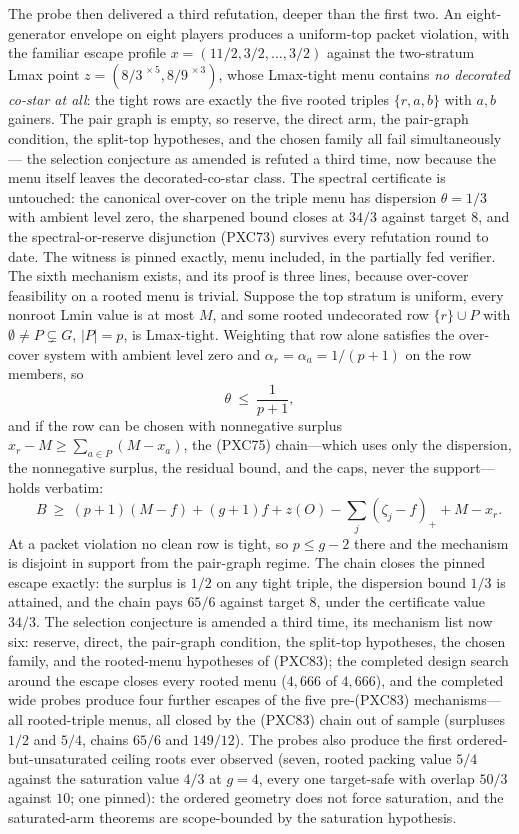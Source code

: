 \documentclass[11pt]{article}
\begin{document}
The probe then delivered a third refutation, deeper than the first
two.  An eight-generator envelope on eight players produces a
uniform-top packet violation, with the familiar escape profile
$x=(11/2,3/2,\dots,3/2)$ against the two-stratum Lmax point
$z=(8/3^{\,\times5},8/9^{\,\times3})$, whose Lmax-tight menu contains
\emph{no decorated co-star at all}: the tight rows are exactly the five
rooted triples $\{r,a,b\}$ with $a,b$ gainers.  The pair graph is
empty, so reserve, the direct arm, the pair-graph condition, the
split-top hypotheses, and the chosen family all fail simultaneously---
the selection conjecture as amended is refuted a third time, now
because the menu itself leaves the decorated-co-star class.  The
spectral certificate is untouched: the canonical over-cover on the
triple menu has dispersion $\theta=1/3$ with ambient level zero, the
sharpened bound closes at $34/3$ against target $8$, and the
spectral-or-reserve disjunction (PXC73) survives every refutation
round to date.  The witness is pinned exactly, menu included, in the
partially fed verifier.  The sixth mechanism exists, and its proof is three lines,
because over-cover feasibility on a rooted menu is trivial.  Suppose
the top stratum is uniform, every nonroot Lmin value is at most $M$,
and some rooted undecorated row $\{r\}\cup P$ with
$\emptyset\ne P\subsetneq G$, $|P|=p$, is Lmax-tight.  Weighting that
row alone satisfies the over-cover system with ambient level zero and
$\alpha_r=\alpha_a=1/(p+1)$ on the row members, so
\[
 \theta\ \le\ \frac{1}{p+1},                          \tag{PXC83a}
\]
and if the row can be chosen with nonnegative surplus
$x_r-M\ge\sum_{a\in P}(M-x_a)$, the (PXC75) chain---which uses only
the dispersion, the nonnegative surplus, the residual bound, and the
caps, never the support---holds verbatim:
\[
 \boxed{\qquad
 B\ \ge\ (p+1)(M-f)+(g+1)f
 +z(O)-\sum_j(\zeta_j-f)_+ +M-x_r.
 \qquad}                                             \tag{PXC83}
\]
At a packet violation no clean row is tight, so $p\le g-2$ there and
the mechanism is disjoint in support from the pair-graph regime.  The
chain closes the pinned escape exactly: the surplus is $1/2$ on any
tight triple, the dispersion bound $1/3$ is attained, and the chain
pays $65/6$ against target $8$, under the certificate value $34/3$.
The selection conjecture is amended a third time, its mechanism list
now six: reserve, direct, the pair-graph condition, the split-top
hypotheses, the chosen family, and the rooted-menu hypotheses of
(PXC83); the completed design search around the escape closes every
rooted menu ($4{,}666$ of $4{,}666$), and the completed wide probes
produce four further escapes of the five pre-(PXC83) mechanisms---all
rooted-triple menus, all closed by the (PXC83) chain out of sample
(surpluses $1/2$ and $5/4$, chains $65/6$ and $149/12$).  The probes
also produce the first ordered-but-unsaturated ceiling roots ever
observed (seven, rooted packing value $5/4$ against the saturation
value $4/3$ at $g=4$, every one target-safe with overlap $50/3$
against $10$; one pinned): the ordered geometry does not force
saturation, and the saturated-arm theorems are scope-bounded by the
saturation hypothesis.
\end{document}
